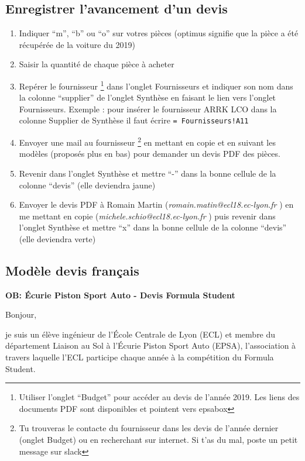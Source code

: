 \subsection{Enregistrer l'avancement d'un devis}
\begin{enumerate}
	\item Indiquer “m”, “b” ou “o” sur votres pièces (optimus signifie que la pièce a été récupérée de la voiture du 2019)
	\item Saisir la quantité de chaque pièce à acheter
	\item Repérer le fournisseur \footnote{Utiliser l’onglet “Budget” pour accéder au devis de l’année 2019. Les liens des documents PDF sont disponibles et pointent vers epsabox} dans l’onglet Fournisseurs et indiquer son nom dans la colonne  “supplier” de l’onglet Synthèse en faisant le lien vers l’onglet Fournisseurs. Exemple​ : pour insérer le fournisseur ARRK LCO dans la colonne Supplier de Synthèse il faut écrire \texttt{=​ Fournisseurs!A11}
	\item Envoyer une mail au fournisseur \footnote{Tu trouveras le contacte du fournisseur dans les devis de l’année dernier (onglet Budget) ou en recherchant sur internet. Si t’as du mal, poste un petit message sur slack} en mettant en copie et en suivant les modèles (proposés
	plus en bas) pour demander un devis PDF des pièces.
	\item Revenir dans l’onglet Synthèse et mettre “-” dans la bonne cellule de la colonne “devis” (elle deviendra jaune)
	\item Envoyer le devis PDF à Romain Martin (​\textit{ romain.matin@ecl18.ec-lyon.fr}​ ) en me mettant en copie (​ \textit{michele.schio@ecl18.ec-lyon.fr}​ ) puis revenir dans l’onglet Synthèse et mettre “x” dans la bonne cellule de la colonne “devis” (elle deviendra verte)
	
\end{enumerate}

\newpage
\subsection{Modèle devis français}
\textbf{OB: Écurie Piston Sport Auto - Devis Formula Student}

Bonjour,\\

\par je suis un élève ingénieur de l’École Centrale de Lyon (ECL) et membre du département Liaison au Sol à l’Écurie Piston Sport Auto (EPSA), l’association à travers laquelle l’ECL participe chaque
année à la compétition du Formula Student.

